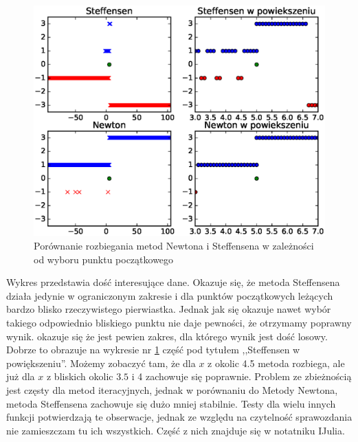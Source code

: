 \documentclass{article}
\begin{document}
\begin{figure}[H]
    \centering
	\includegraphics[width= 1 \textwidth]{figure_3.eps}
    \caption{Porównanie rozbiegania metod Newtona i Steffensena w zależności od wyboru punktu początkowego}
 	\label{w2}
\end{figure}
Wykres przedstawia dość interesujące dane. Okazuje się, że metoda Steffensena działa jedynie w ograniczonym zakresie i dla punktów początkowych leżących bardzo blisko rzeczywistego pierwiastka. Jednak jak się okazuje nawet wybór takiego odpowiednio bliskiego punktu nie daje pewności, że otrzymamy poprawny wynik. okazuje się że jest pewien zakres, dla którego wynik jest dość losowy. Dobrze to obrazuje na wykresie nr \ref{w2} część pod tytułem  ,,Steffensen w powiększeniu''. Możemy zobaczyć tam, że dla $x$ z okolic 4.5 metoda rozbiega, ale już dla $x$ z bliskich okolic $3.5$ i 4 zachowuje się poprawnie. Problem ze zbieżnością jest częsty dla metod iteracyjnych, jednak w porównaniu do Metody Newtona, metoda Steffensena zachowuje się dużo mniej stabilnie. Testy dla wielu innych funkcji potwierdzają te obserwacje, jednak ze względu na czytelność sprawozdania nie zamieszczam tu ich wszystkich. Część z nich znajduje się w notatniku IJulia. 
\end{document}
